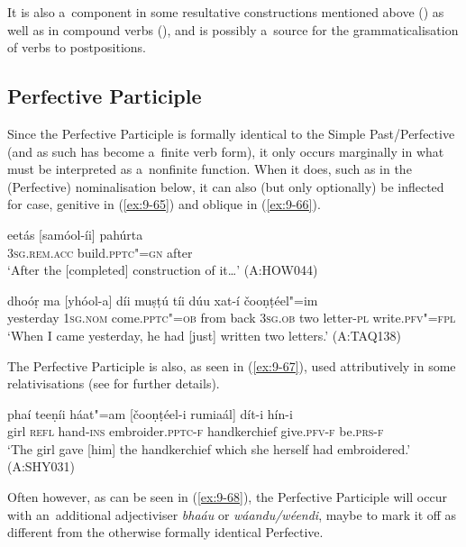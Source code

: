 It is also a~component in some resultative constructions mentioned above () as well as in compound verbs (), and is possibly a~source for the grammaticalisation of verbs to postpositions.


\subsection{Perfective Participle}
\label{subsec:9-3-2}


Since the Perfective Participle is formally identical to the Simple Past/Perfective (and as such has become a~finite verb form), it only occurs marginally in what must be interpreted as a~nonfinite function. When it does, such as in the (Perfective) nominalisation below, it can also (but only optionally) be inflected for case, genitive in (\ref{ex:9-65}) and oblique in (\ref{ex:9-66}).

\begin{exe}
\ex
\label{ex:9-65}
\gll eetás [samóol-íi] pahúrta \\
\textsc{3sg.rem.acc} build.\textsc{pptc"=gn} after \\
\glt `After the [completed] construction of it{\ldots}' (A:HOW044)

\ex
\label{ex:9-66}
\gll dhoóṛ ma [yhóol-a] díi muṣṭú tíi dúu xat-í čooṇṭéel"=im\\
yesterday 1\textsc{sg.nom} come.\textsc{pptc"=ob} from back \textsc{3sg.ob} two letter-\textsc{pl} write.\textsc{pfv"=fpl}\\
\glt `When I came yesterday, he had [just] written two letters.' (A:TAQ138)
\end{exe}

The Perfective Participle is also, as seen in (\ref{ex:9-67}), used attributively in some relativisations (see  for further details).

\begin{exe}
\ex
\label{ex:9-67}
\gll phaí teeṇíi háat"=am [čooṇṭéel-i rumiaál] dít-i hín-i \\
girl \textsc{refl} hand-\textsc{ins} embroider.\textsc{pptc-f} handkerchief give.\textsc{pfv-f} be.\textsc{prs-f} \\
\glt `The girl gave [him] the handkerchief which she herself had embroidered.' (A:SHY031)
\end{exe}

Often however, as can be seen in (\ref{ex:9-68}), the Perfective Participle will occur with an~additional adjectiviser \textit{bhaáu} or \textit{wáandu/wéendi}, maybe to mark it off as different from the otherwise formally identical Perfective.

